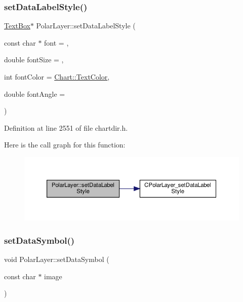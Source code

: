 \subsubsection{\texorpdfstring{set\+Data\+Label\+Style()}{setDataLabelStyle()}}
{\footnotesize\ttfamily \hyperlink{class_text_box}{Text\+Box}$\ast$ Polar\+Layer\+::set\+Data\+Label\+Style (\begin{DoxyParamCaption}\item[{const char $\ast$}]{font = {},  }\item[{double}]{font\+Size = {},  }\item[{int}]{font\+Color = {\ttfamily \hyperlink{namespace_chart_abee0d882fdc9ad0b001245ad9fc64011a879e14f2f5024caccc047374342321ef}{Chart\+::\+Text\+Color}},  }\item[{double}]{font\+Angle = {} }\end{DoxyParamCaption})\hspace{0.3cm}{\ttfamily [inline]}}



Definition at line 2551 of file chartdir.\+h.

Here is the call graph for this function\+:
\nopagebreak
\begin{figure}[H]
\begin{center}
\leavevmode
\includegraphics[width=350pt]{class_polar_layer_ac9e8ab5fbec672ba966af4b6b7eda14c_cgraph}
\end{center}
\end{figure}
\mbox{\label{class_polar_layer_afea23161a7cef63c1dbdf7525dc33b1d}} 
\subsubsection{\texorpdfstring{set\+Data\+Symbol()}{setDataSymbol()}\hspace{0.1cm}{\footnotesize\ttfamily [1/4]}}
{\footnotesize\ttfamily void Polar\+Layer\+::set\+Data\+Symbol (\begin{DoxyParamCaption}\item[{const char $\ast$}]{image }\end{DoxyParamCaption})\hspace{0.3cm}{\ttfamily [inline]}}



